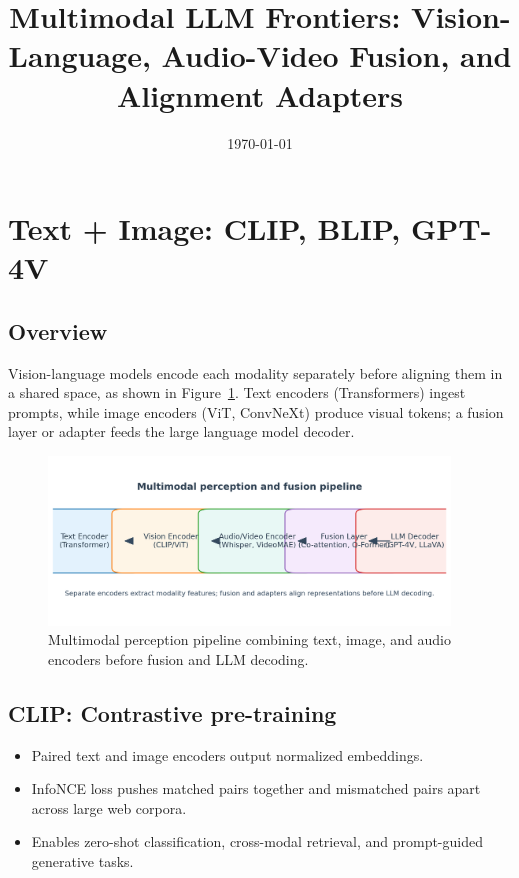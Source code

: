 \documentclass{article}
\title{Multimodal LLM Frontiers: Vision-Language, Audio-Video Fusion, and Alignment Adapters}
\author{}
\date{\today}
\begin{document}
\maketitle

\section{Text + Image: CLIP, BLIP, GPT-4V}
\subsection{Overview}
Vision-language models encode each modality separately before aligning them in a shared space, as shown in Figure~\ref{fig:multimodal_pipeline_en}. Text encoders (Transformers) ingest prompts, while image encoders (ViT, ConvNeXt) produce visual tokens; a fusion layer or adapter feeds the large language model decoder.
\begin{figure}[H]
  \centering
  \includegraphics[width=0.95\textwidth]{multimodal_pipeline.png}
  \caption{Multimodal perception pipeline combining text, image, and audio encoders before fusion and LLM decoding.}
  \label{fig:multimodal_pipeline_en}
\end{figure}

\subsection{CLIP: Contrastive pre-training}
\begin{itemize}
  \item Paired text and image encoders output normalized embeddings.
  \item InfoNCE loss pushes matched pairs together and mismatched pairs apart across large web corpora.
  \item Enables zero-shot classification, cross-modal retrieval, and prompt-guided generative tasks.
\end{itemize}
\end{document}
